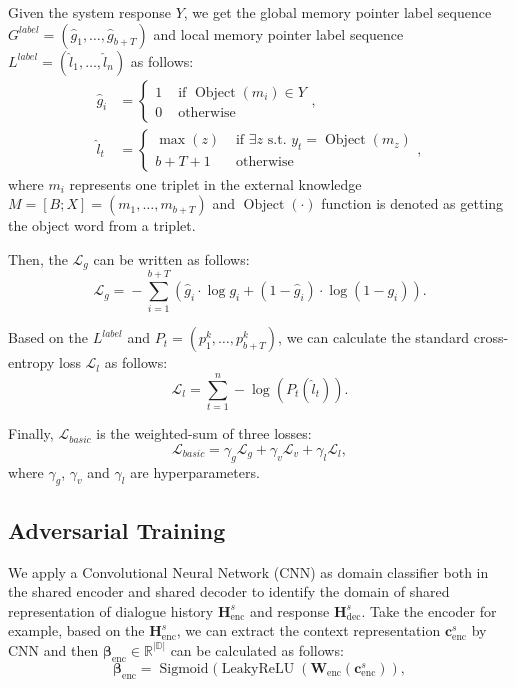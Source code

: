 \documentclass[11pt,a4paper]{article}
\begin{document}
Given the system response $Y$, we get the global memory pointer label sequence $G^{label} = (\hat g_1, \dots, \hat g_{b+T})$ and local memory pointer label sequence $L^{label} = (\hat l_1, \dots, \hat l_n)$ as follows: 
\begin{align}
\hat g_{i}&\!=\!\left\{\begin{array}{ll}{1} & {\text { if } \operatorname{Object}(m_{i}) \in Y} \\ {0} & {\text { otherwise }}\end{array}\right., \\
\hat{l}_{t}&\!=\!\left\{\begin{array}{ll}{\max (z)} & {\text { if } \exists z \text { s.t. } y_{t}\!=\!\operatorname{Object}(m_{z})} \\ {b+T+1} & {\text { otherwise }}\end{array}\right.,
\end{align}
where $m_i$ represents one triplet in the external knowledge $M=[B;X]=(m_1, \dots, m_{b+T})$ and $\operatorname{Object}(\cdot)$ function is denoted as getting the object word from a triplet.

Then, the $\mathcal{L}_{g}$ can be written as follows:
\begin{equation}
\mathcal{L}_{g}\!=\!-\sum_{i=1}^{b+T}\left(\hat g_{i} \cdot \log g_{i} + (1-\hat g_{i}) \cdot \log \left(1-g_{i}\right)\right). 
\end{equation}

Based on the $L^{label}$ and $P_t=(p_1^k, \dots, p_{b+T}^k)$, we can calculate the standard cross-entropy loss $\mathcal{L}_{l}$ as follows:
\begin{equation}
\mathcal{L}_{l}=\sum_{t=1}^{n}-\log (P_t(\hat l_{t})).
\end{equation}

Finally, $\mathcal{L}_{basic}$ is the weighted-sum of three losses:
\begin{equation}
\mathcal{L}_{basic} = \gamma_{g} \mathcal{L}_{g} + \gamma_{v} \mathcal{L}_{v} + \gamma_{l} \mathcal{L}_{l},
\end{equation}
where $\gamma_{g}$, $\gamma_{v}$ and $\gamma_{l}$ are hyperparameters.

\subsection{Adversarial Training}
We apply a Convolutional Neural Network (CNN) as domain classifier both in the shared encoder and shared decoder to identify the domain of shared representation of dialogue history $\boldsymbol{H}_{\text{enc}}^{s}$ and response $\boldsymbol{H}_{\text{dec}}^{s}$. Take the encoder for example, based on the $\boldsymbol{H}_{\text{enc}}^{s}$, we can extract the context representation $\boldsymbol{c}_{\text{enc}}^s$ by CNN and then $\boldsymbol{\beta}_{\text{enc}} \in \mathbb{R^{|D|}}$ can be calculated as follows:
\begin{equation}
	\boldsymbol{\beta}^{}_{\text{enc}} \!=\! \operatorname{Sigmoid}(\operatorname{LeakyReLU}(\boldsymbol{W}^{}_{\text{enc}}(\boldsymbol{c}^s_{\text{enc}})),
\end{equation}
\end{document}
